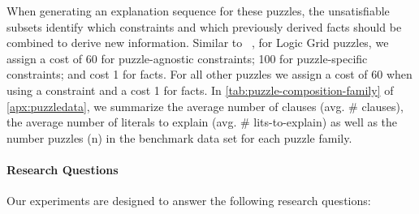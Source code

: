 \documentclass[twoside,11pt]{article}
\newcommand\citet[1]{\citeauthor{#1}~\citeyear{#1}}
\newcommand\comment[1]{\marginpar{\tiny #1}}
\renewcommand\comment[1]{#1}
\newcommand{\tias}[1]{{\comment{\color{blue}Tias:#1}}}
\newcommand{\bart}[1]{{\comment{\color{OliveGreen}Bart: #1}}}
\begin{document}
When generating an explanation sequence for these puzzles, the unsatisfiable subsets identify which constraints and which previously derived facts should be combined to derive new information. 
Similar to \citet{ijcai2021}, for Logic Grid puzzles, we assign a cost of 60 for puzzle-agnostic constraints; 100 for puzzle-specific constraints; and cost 1 for facts. 
For all other puzzles we assign a cost of 60 when using a constraint and a cost 1 for facts.
In  \cref{tab:puzzle-composition-family} of \cref{apx:puzzledata}, we summarize the average number of clauses (avg. $\#$ {clauses}), the average number of literals to explain (avg. $\#$ lits-to-explain) as well as the number puzzles (n) in the benchmark data set for each puzzle family. 
\paragraph{Research Questions} Our experiments are designed to answer the following research questions:  
\end{document}
